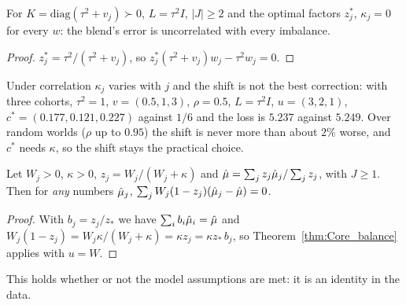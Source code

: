 \begin{lemma}[Independent cohorts: $\kappa = 0$]\label{lem:Core_imbalanceCov_diag}
  \leanok
  For $K = \mathrm{diag}(\tau^2 + v_j) \succ 0$, $L = \tau^2I$, $|J| \ge 2$ and the
  optimal factors $z_j^*$, $\kappa_j = 0$ for every $w$: the blend's error is
  uncorrelated with every imbalance.
\end{lemma}
\begin{proof}
  \leanok
  $z_j^* = \tau^2/(\tau^2 + v_j)$, so $z_j^*(\tau^2 + v_j)w_j - \tau^2w_j = 0$.
\end{proof}

\begin{remark}\label{rem:commonShift}
  Under correlation $\kappa_j$ varies with $j$ and the shift is not the best
  correction: with three cohorts, $\tau^2 = 1$, $v = (0.5, 1, 3)$,
  $\rho = 0.5$, $L = \tau^2I$, $u = (3, 2, 1)$, $c^* = (0.177, 0.121, 0.227)$
  against $1/6$ and the loss is $5.237$ against $5.249$. Over random worlds
  ($\rho$ up to $0.95$) the shift is never more than about $2\%$ worse, and
  $c^*$ needs $\kappa$, so the shift stays the practical choice.
\end{remark}

\begin{theorem}\label{thm:bs_balance}
  \leanok
  Let $W_j > 0$, $\kappa > 0$, $z_j = W_j/(W_j + \kappa)$ and
  $\hat\mu = \sum_j z_j\hat\mu_j / \sum_j z_j$, with $J \ge 1$. Then for
  \emph{any} numbers $\hat\mu_j$,
  $\sum_j W_j(1 - z_j)(\hat\mu_j - \hat\mu) = 0$.
\end{theorem}
\begin{proof}
  \leanok
  With $b_j = z_j/z_*$ we have $\sum_i b_i\hat\mu_i = \hat\mu$ and
  $W_j(1 - z_j) = W_j\kappa/(W_j + \kappa) = \kappa z_j = \kappa z_*\,b_j$, so
  Theorem~\ref{thm:Core_balance} applies with $u = W$.
\end{proof}

This holds whether or not the model assumptions  are met: it is
an identity in the data.

